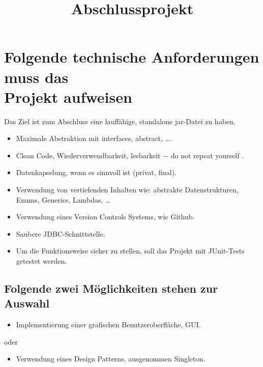 \documentclass[12pt, oneside]{article}
\title{Abschlussprojekt}
\begin{document}
 \setlength{\parindent}{0em} 
\maketitle

\section{Folgende technische Anforderungen muss das \\ Projekt aufweisen}
\vspace{0.5cm}
\begin{tcolorbox}
	\begin{center}
		Das Ziel ist zum Abschluss eine lauffähige, standalone jar-Datei zu haben.
	\end{center}
\end{tcolorbox}

\begin{itemize}
	\item Maximale Abstraktion mit interfaces, abstract, \ldots.
	\item Clean Code, Wiederverwendbarkeit, lesbarkeit $-$ 	\glqq do not repeat yourself	\grqq.
	\item Datenkapselung, wenn es sinnvoll ist (privat, final).
	\item Verwendung von vertiefenden Inhalten wie: abstrakte Datenstrukturen, Enums, Generics, Lambdas, \ldots
	\item Verwendung eines Version Controls Systems, wie Github.
	\item Saubere JDBC-Schnittstelle.
	\item Um die Funktionsweise sicher zu stellen, soll das Projekt mit JUnit-Tests \\ getestet werden.
\end{itemize}

\subsection*{Folgende zwei Möglichkeiten stehen zur Auswahl}
\begin{itemize}
	\item Implementierung einer grafischen Benutzeroberfläche, GUI.
\end{itemize}
\begin{center}
	oder
\end{center}
\begin{itemize}
	\item Verwendung eines Design Patterns, ausgenommen Singleton.
\end{itemize}
\end{document}
